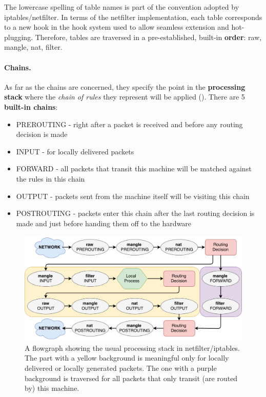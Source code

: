 The lowercase spelling of table names is part of the convention adopted by
iptables/netfilter.  In terms of the netfilter implementation, each table
corresponds to a new hook in the hook system used to allow seamless extension
and hot-plugging.  Therefore, tables are traversed in a pre-established,
built-in \textbf{order}: raw, mangle, nat, filter.

\paragraph{Chains.}
As far as the chains are concerned, they specify the point in the
\textbf{processing stack} where the \emph{chain of rules} they represent will
be applied ().  There are 5
\textbf{built-in chains}:
\begin{itemize}
  \item PREROUTING - right after a packet is received and before any routing
    decision is made
  \item INPUT - for locally delivered packets
  \item FORWARD - all packets that transit this machine will be matched against
    the rules in this chain
  \item OUTPUT - packets sent from the machine itself will be visiting this
    chain
  \item POSTROUTING - packets enter this chain after the last routing decision
    is made and just before handing them off to the hardware
\end{itemize}

\begin{figure}[h]
  \centering
  \captionsetup{justification=centering}
  \includegraphics[scale=0.5]{assets/img/iptables-organization}
  \caption[A flowgraph showing the processing stack in netfilter/iptables.]{A
  flowgraph showing the usual processing stack in netfilter/iptables. The part
  with a yellow background is meaningful only for locally delivered or locally
  generated packets. The one with a purple background is traversed for all
  packets that only transit (are routed by) this machine.}
  \label{fig:iptables-organization}
\end{figure}

